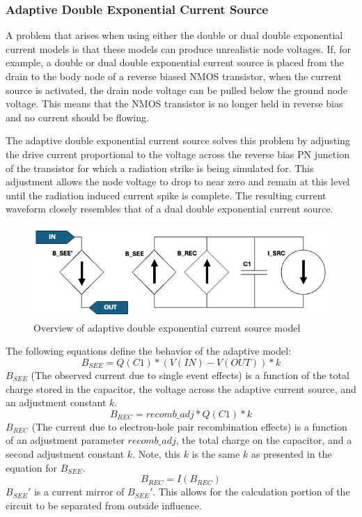 \documentclass[conference]{IEEEtran}
\begin{document}
    \subsubsection{Adaptive Double Exponential Current Source}
    A problem that arises when using either the double or dual double exponential current models is that these models can produce unrealistic node voltages.
    If, for example, a double or dual double exponential current source is placed from the drain to the body node of a reverse biased NMOS transistor, when the current source is activated, the drain node voltage can be pulled below the ground node voltage.
    This means that the NMOS transistor is no longer held in reverse bias and no current should be flowing.

    The adaptive double exponential current source solves this problem by adjusting the drive current proportional to the voltage across the reverse bias PN junction of the transistor for which a radiation strike is being simulated for.
    This adjustment allows the node voltage to drop to near zero and remain at this level until the radiation induced current spike is complete.
    The resulting current waveform closely resembles that of a dual double exponential current source.

    \begin{figure}[htbp]
        \centering
        \includegraphics[width=0.95\linewidth]{Adaptive_Model_Cropped}
        \caption{Overview of adaptive double exponential current source model \cite{Kauppila2009}}
        \label{fig:adaptive_model_overview}
    \end{figure}

    The following equations define the behavior of the adaptive model:
            {\large
    \[B_{SEE}=Q(C1)*(V(IN)-V(OUT))*k\]
    }
    \(B_{SEE}\) (The observed current due to single event effects) is a function of the total charge stored in the capacitor, the voltage across the adaptive current source, and an adjustment constant \(k\).
            {\large
    \[B_{REC}=recomb\_adj*Q(C1)*k\]
    }
    \(B_{REC}\) (The current due to electron-hole pair recombination effects) is a function of an adjustment parameter \(recomb\_adj\), the total charge on the capacitor, and a second adjustment constant \(k\).
    Note, this \(k\) is the same \(k\) as presented in the equation for \(B_{SEE}\).
            {\large
    \[B_{REC}=I(B_{REC})\]
    }
    \(B_{SEE}'\) is a current mirror of \(B_{SEE}'\).
    This allows for the calculation portion of the circuit to be separated from outside influence.
\end{document}
